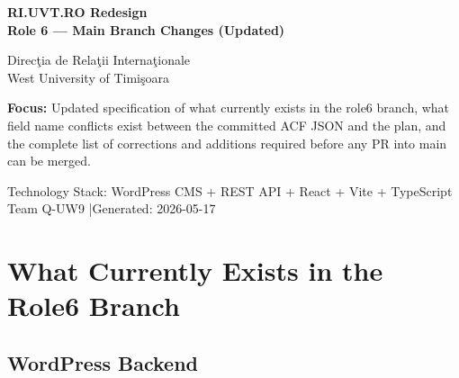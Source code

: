 \documentclass[12pt,a4paper]{article}
\begin{document}

\begin{titlepage}
    \pagecolor{uvtDarkBlue}
    \color{white}

    \vspace*{2cm}

    {\Huge\bfseries RI.UVT.RO Redesign\\[0.25em]
    Role 6 --- Main Branch Changes (Updated)\par}

    \vspace{0.8cm}

    {\Large Direc\c{t}ia de Rela\c{t}ii Interna\c{t}ionale\\
    West University of Timi\c{s}oara\par}

    \vspace{1.5cm}

    \begin{yellowbox}
        \color{textGray}
        \textbf{Focus:} Updated specification of what currently exists in the role6
        branch, what field name conflicts exist between the committed ACF JSON and the
        plan, and the complete list of corrections and additions required before any PR
        into main can be merged.
    \end{yellowbox}

    \vfill

    {\large Technology Stack: WordPress CMS + REST API + React + Vite + TypeScript\\[0.4em]
    Team Q-UW9 \quad|\quad Generated: 2026-05-17}

    \vspace{1cm}
\end{titlepage}

\nopagecolor
\color{textGray}

\tableofcontents
\newpage

\section{What Currently Exists in the Role6 Branch}

\subsection{WordPress Backend}
\end{document}
